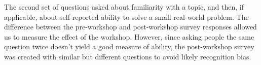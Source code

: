 \documentclass[10pt, twocolumn]{article}
\begin{document}

The second set of questions asked about familiarity with a topic,
and then,
if applicable,
about self-reported ability to solve a small real-world problem.
The difference between the pre-workshop and post-workshop survey responses allowed us to measure the effect of the workshop.
However,
since asking people the same question twice doesn't yield a good measure of ability,
the post-workshop survey was created with similar but different questions
to avoid likely recognition bias.
\end{document}
